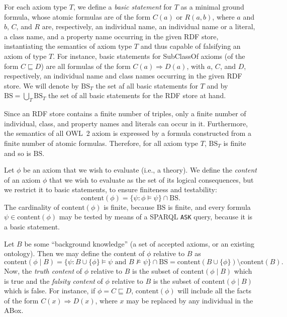 \documentclass[a4paper]{article}
\newcounter{ex}
\begin{document}
For each axiom type $T$, we define a \emph{basic statement} for $T$ as a minimal
ground formula, whose atomic formulas are of the form $C(a)$ or $R(a, b)$,
where $a$ and $b$, $C$, and $R$ are, respectively, an individual name,
an individual name or a literal, a class name,
and a property name occurring in the given RDF store, instantiating the semantics
of axiom type $T$ and thus capable of falsifying an axiom of type $T$.
For instance, basic statements for \textsf{SubClassOf} axioms (of the form $C \sqsubseteq D$)
are all formulas of the form $C(a) \Rightarrow D(a)$, with $a$, $C$, and $D$,
respectively, an individual name and class names occurring in the given RDF store.
We will denote by $\mathrm{BS}_T$ the set af all basic statements for $T$
and by $\mathrm{BS} = \bigcup_T \mathrm{BS}_T$ the set of all basic statements
for the RDF store at hand.

Since an RDF store contains a finite number of triples, only a finite number of
individual, class, and property names and literals can occur in it. Furthermore, the semantics
of all OWL~2 axiom is expressed by a formula constructed from a finite number of
atomic formulas. Therefore, for all axiom type $T$, $\mathrm{BS}_T$ is finite
and so is $\mathrm{BS}$.

Let $\phi$ be an axiom that we wish to evaluate (i.e., a theory).
We define the \emph{content} of an axiom $\phi$ that we wish to evaluate
as the set of its logical consequences, but we restrict it to basic statements, 
to ensure finiteness and testability:
\begin{equation}\label{eq:content}
  \mathrm{content}(\phi) = \{\psi : \phi \models \psi\} \cap \mathrm{BS}.
\end{equation}
The cardinality of $\mathrm{content}(\phi)$ is finite, because $\mathrm{BS}$ is finite,
and every formula $\psi \in \mathrm{content}(\phi)$ may be tested by means of a
SPARQL \texttt{ASK} query, because it is a basic statement.

Let $B$ be some ``background knowledge'' (a set of accepted axioms, or an existing ontology).
Then we may define the content of $\phi$ relative to $B$ as
\begin{equation}\label{eq:relative-content}
  \mathrm{content}(\phi \mid B) = \{\psi : B \cup \{\phi\} \models \psi \mbox{ and } B \not\models \psi\} \cap \mathrm{BS}
  = \mathrm{content}(B \cup \{\phi\}) \setminus \mathrm{content}(B).
\end{equation}
Now, the \emph{truth content} of $\phi$ relative to $B$ is the subset
of $\mathrm{content}(\phi \mid B)$ which is true and the \emph{falsity content}
of $\phi$ relative to $B$ is the subset of $\mathrm{content}(\phi \mid B)$ which
is false.
For instance, if $\phi = C \sqsubseteq D$, $\mathrm{content}(\phi)$ will include
all the facts of the form $C(x) \Rightarrow D(x)$, where $x$ may be replaced by
any individual in the ABox.
\end{document}
